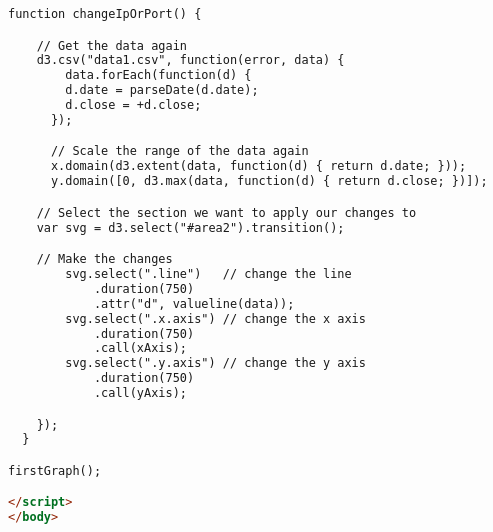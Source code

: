 \begin{lstlisting}[language=HTML]
function changeIpOrPort() {

    // Get the data again
    d3.csv("data1.csv", function(error, data) {
        data.forEach(function(d) {
        d.date = parseDate(d.date);
        d.close = +d.close;
      });

      // Scale the range of the data again 
      x.domain(d3.extent(data, function(d) { return d.date; }));
      y.domain([0, d3.max(data, function(d) { return d.close; })]);

    // Select the section we want to apply our changes to
    var svg = d3.select("#area2").transition();

    // Make the changes
        svg.select(".line")   // change the line
            .duration(750)
            .attr("d", valueline(data));
        svg.select(".x.axis") // change the x axis
            .duration(750)
            .call(xAxis);
        svg.select(".y.axis") // change the y axis
            .duration(750)
            .call(yAxis);

    });
  }

firstGraph();

</script>
</body>

\end{lstlisting}
